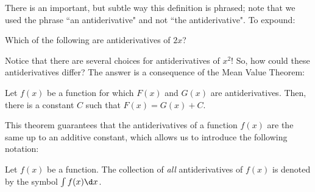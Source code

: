 \documentclass[nooutcomes]{ximera}
\begin{document}
 There is an important, but subtle way this definition is phrased; note that we used the phrase ``an antiderivative" and not ``the antiderivative".  To expound:
 
 \begin{question}
  Which of the following are antiderivatives of $2x$?
  \begin{selectAll}
  \end{selectAll}
\end{question}

Notice that there are several choices for antiderivatives of $x^2$!  So, how could these antiderivatives differ?  The answer is a consequence of the Mean Value Theorem:

\begin{theorem}
Let $f(x)$ be a function for which $F(x)$ and $G(x)$ are antiderivatives.  Then, there is a constant $C$ such that $F(x) = G(x) +C$. 
\end{theorem}

This theorem guarantees that the antiderivatives of a function $f(x)$ are the same up to an additive constant, which allows us to introduce the following notation:


\begin{definition}
Let $f(x)$ be a function.  The collection of \emph{all} antiderivatives of $f(x)$ is denoted by the symbol $\int f(x) \d x$. 
\end{definition}

\end{document}
